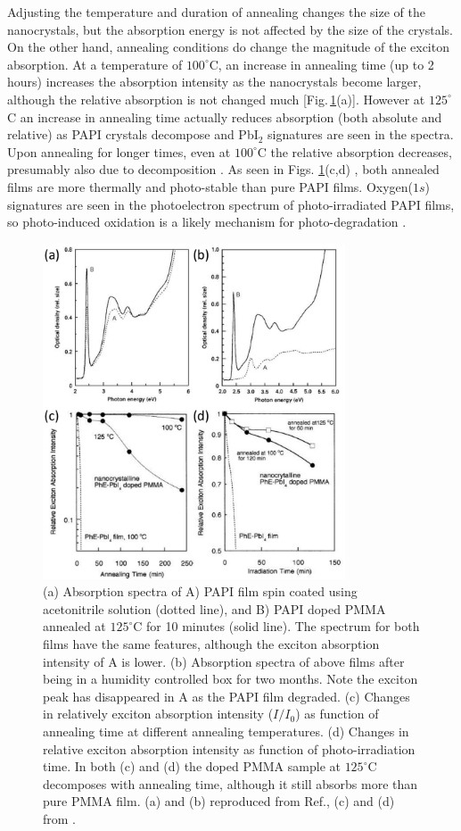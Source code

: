 Adjusting the temperature and duration of annealing changes the size of the nanocrystals, but the absorption energy is not affected by the size of the crystals. On the other hand, annealing conditions do change the magnitude of the exciton absorption. At a temperature of $100^{\circ}$C, an increase in annealing time (up to 2\,hours) increases the absorption intensity as the nanocrystals become larger, although the relative absorption is not changed much [Fig.\,\ref{2Fig10}(a)]. However at $125^{\circ}$C an increase in annealing time actually reduces absorption (both absolute and relative) as PAPI crystals decompose and Pb$\textrm{I}_2$ signatures are seen in the spectra. Upon annealing for longer times, even at $100^{\circ}$C the relative absorption decreases, presumably also due to decomposition \cite{Kitazawa2002}. As seen in Figs. \ref{2Fig10}(c,d) , both annealed films are more thermally and photo-stable than pure PAPI films. Oxygen($1s$) signatures are seen in the photoelectron spectrum of photo-irradiated PAPI films, so photo-induced oxidation is a likely mechanism for photo-degradation \cite{Kitazawa2002}.

\begin{figure}
\centering
\includegraphics[width=0.8\textwidth]{Fig10}
\caption{ (a) Absorption spectra of A) PAPI film spin coated using acetonitrile solution (dotted line), and B) PAPI doped PMMA annealed at $125^{\circ}$C for 10 minutes (solid line). The spectrum for both films have the same features, although the exciton absorption intensity of A is lower. (b) Absorption spectra of above films after being in a humidity controlled box for two months. Note the exciton peak has disappeared in A as the PAPI film degraded. (c) Changes in relatively exciton absorption intensity ($I/I_0$) as function of annealing time at different annealing temperatures. (d) Changes in relative exciton absorption intensity as function of photo-irradiation time. In both (c) and (d) the doped PMMA sample at $125^{\circ}$C decomposes with annealing time, although it still absorbs more than pure PMMA film. (a) and (b) reproduced from Ref.\cite{Kitazawa1998}, (c) and (d) from \cite{Kitazawa2002}.}
\label{2Fig10}
\end{figure}

